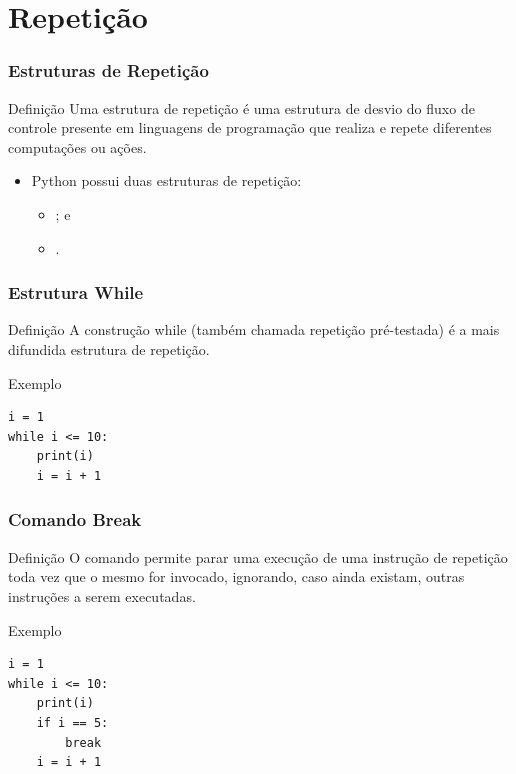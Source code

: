 \documentclass[aspectratio=169]{beamer} %
\begin{document}
\section{Repetição}

\begin{frame}
\frametitle{Estruturas de Repetição}

\begin{block}{Definição}
Uma estrutura de repetição é uma estrutura de desvio do fluxo de controle presente em linguagens de programação que realiza e repete diferentes computações ou ações.
\end{block}\vfill

\begin{itemize}
\item Python possui duas estruturas de repetição:
\begin{itemize}
	\item {}; e
	\item {}.
\end{itemize}
\end{itemize}
\end{frame}

\begin{frame}[fragile]
\frametitle{Estrutura While}

\begin{block}{Definição}
A construção while (também chamada repetição pré-testada) é a mais difundida estrutura de repetição.
\end{block}\vfill

\begin{exampleblock}{Exemplo}
\begin{lstlisting}
i = 1
while i <= 10:
    print(i)
    i = i + 1
\end{lstlisting}
\end{exampleblock}
\end{frame}

\begin{frame}[fragile]
\frametitle{Comando Break}

\begin{block}{Definição}
O comando  permite parar uma execução de uma instrução de repetição toda vez que o mesmo for invocado, ignorando, caso ainda existam, outras instruções a serem executadas.
\end{block}\vfill

\begin{exampleblock}{Exemplo}
	\begin{lstlisting}
i = 1
while i <= 10:
    print(i)
    if i == 5: 
        break
    i = i + 1
	\end{lstlisting}
\end{exampleblock}
\end{frame}
\end{document}
